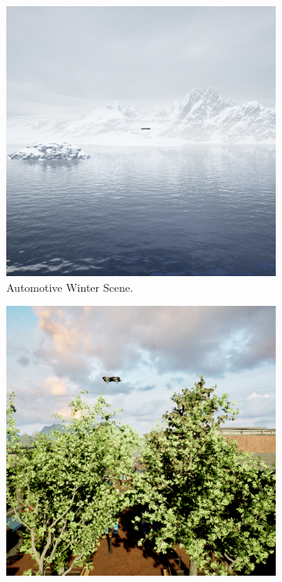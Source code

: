 \documentclass[twoside]{ctuthesis}
\theoremstyle{plain}
\theoremstyle{definition}
\theoremstyle{note}
\begin{document}
\begin{figure}
	\centering
	\begin{subfigure}[b]{0.3\textwidth}
		\centering
		\includegraphics[width=\textwidth]{snow_rgb.png}
		\caption{Automotive Winter Scene.}
	\end{subfigure}
	\hfill
	\begin{subfigure}[b]{0.3\textwidth}
		\centering
		\includegraphics[width=\textwidth]{city_rgb.png}

\end{subfigure}
\end{figure}
\end{document}
